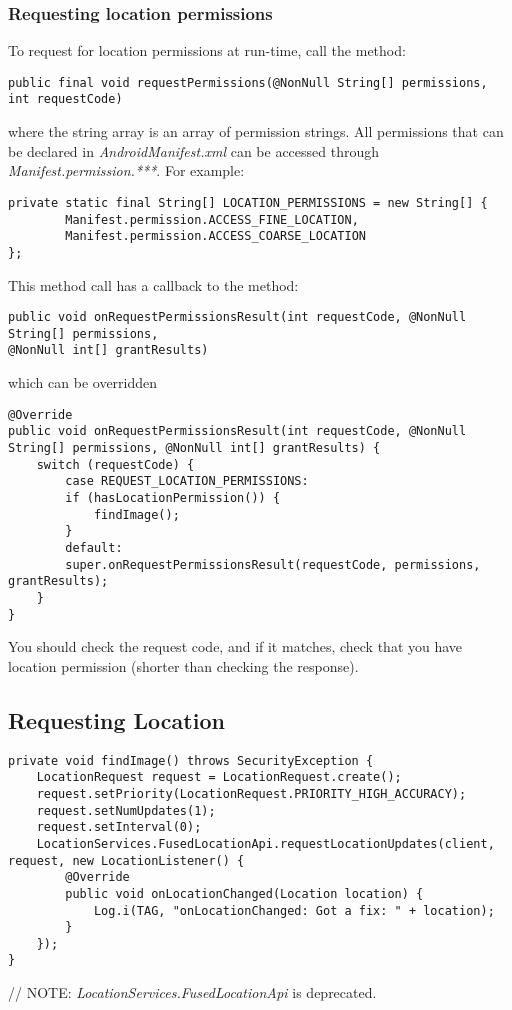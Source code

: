 \documentclass[]{article}
\renewcommand{\it}[1]{\textit{#1}}
\begin{document}
\subsubsection{Requesting location permissions}
To request for location permissions at run-time, call the method:
\begin{lstlisting}
public final void requestPermissions(@NonNull String[] permissions, int requestCode)
\end{lstlisting}
where the string array is an array of permission strings.  All permissions that can be declared in \it{AndroidManifest.xml} can be accessed through \it{Manifest.permission.***}.  For example:
\begin{lstlisting}
private static final String[] LOCATION_PERMISSIONS = new String[] {
		Manifest.permission.ACCESS_FINE_LOCATION,
		Manifest.permission.ACCESS_COARSE_LOCATION
};
\end{lstlisting}
This method call has a callback to the method:
\begin{lstlisting}
public void onRequestPermissionsResult(int requestCode, @NonNull String[] permissions,
@NonNull int[] grantResults)
\end{lstlisting} 
which can be overridden
\begin{lstlisting}
@Override
public void onRequestPermissionsResult(int requestCode, @NonNull String[] permissions, @NonNull int[] grantResults) {
	switch (requestCode) {
		case REQUEST_LOCATION_PERMISSIONS:
		if (hasLocationPermission()) {
			findImage();
		}
		default:
		super.onRequestPermissionsResult(requestCode, permissions, grantResults);
	}
}
\end{lstlisting}
You should check the request code, and if it matches, check that you have location permission (shorter than checking the response).

\subsection{Requesting Location}
\begin{lstlisting}
private void findImage() throws SecurityException {
	LocationRequest request = LocationRequest.create();
	request.setPriority(LocationRequest.PRIORITY_HIGH_ACCURACY);
	request.setNumUpdates(1);
	request.setInterval(0);
	LocationServices.FusedLocationApi.requestLocationUpdates(client, request, new LocationListener() {
		@Override
		public void onLocationChanged(Location location) {
			Log.i(TAG, "onLocationChanged: Got a fix: " + location);
		}
	});
}
\end{lstlisting}
// NOTE: \it{LocationServices.FusedLocationApi} is deprecated.
\end{document}
